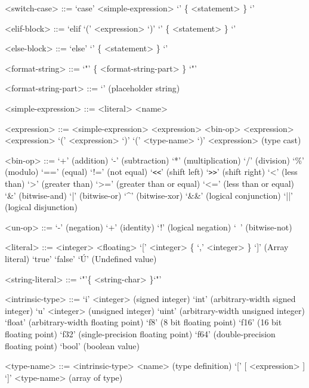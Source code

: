 \documentclass{article}
\begin{document}
\begin{grammar}
  <switch-case> ::= `case' <simple-expression> `{' \{ <statement> \} `}'

  <elif-block> ::= `elif `(' <expression> `)' `{' \{ <statement> \} `}'

  <else-block> ::= `else' `{' \{ <statement> \} `}'

  <format-string> ::= `"' \{ <format-string-part> \} `"'
  
  <format-string-part> ::= `{}' (placeholder string)

  <simple-expression> ::= <literal>
  \alt <name> 

  <expression> ::= <simple-expression>
  \alt <expression> <bin-op> <expression>
   <expression>
  \alt `(' <expression> `)'
  \alt `(' <type-name> `)' <expression> (type cast)

  <bin-op> ::= `+' (addition)
  \alt `-' (subtraction)
  \alt `*' (multiplication)
  \alt `/' (division)
  \alt `\%' (modulo)
  \alt `==' (equal)
  \alt `!=' (not equal)
  \alt `\verb!<<!' (shift left)
  \alt `\verb!>>!' (shift right)
  \alt `<' (less than)
  \alt `>' (greater than)
  \alt `>=' (greater than or equal)
  \alt `<=' (less than or equal)
  \alt `\&' (bitwise-and)
  \alt `|' (bitwise-or)
  \alt `^' (bitwise-xor)
  \alt `\&\&' (logical conjunction)
  \alt `||' (logical disjunction)

  <un-op> ::= `-' (negation)
  \alt `+' (identity)
  \alt `!' (logical negation)
  \alt `~' (bitwise-not)

  <literal> ::= <integer>
  \alt <floating>
  \alt `[' <integer> \{ `,' <integer> \} `]' (Array literal)  
  \alt `true'
  \alt `false'
  \alt `\'U' (Undefined value)

  <string-literal> ::= `"'\{ <string-char> \}`"'

  <intrinsic-type> ::= `i' <integer> (signed integer)
  \alt `int' (arbitrary-width signed integer)
  \alt `u' <integer> (unsigned integer)
  \alt `uint' (arbitrary-width unsigned integer)
  \alt `float' (arbitrary-width floating point)
  \alt `f8' (8 bit floating point)
  \alt `f16' (16 bit floating point)
  \alt `f32' (single-precision floating point)
  \alt `f64' (double-precision floating point)
  \alt `bool' (boolean value)
  
  <type-name> ::= <intrinsic-type>
  \alt <name> (type definition)
  \alt `[' [ <expression> ] `]' <type-name> (array of type)


\end{grammar}
\end{document}
